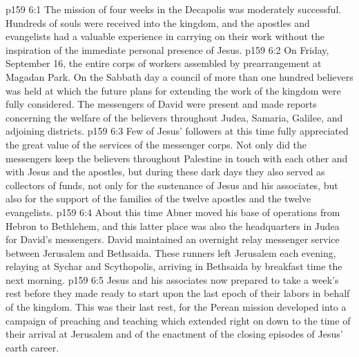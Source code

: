 \vs p159 6:1 The mission of four weeks in the Decapolis was moderately successful. Hundreds of souls were received into the kingdom, and the apostles and evangelists had a valuable experience in carrying on their work without the inspiration of the immediate personal presence of Jesus.
\vs p159 6:2 On Friday, September 16, the entire corps of workers assembled by prearrangement at Magadan Park. On the Sabbath day a council of more than one hundred believers was held at which the future plans for extending the work of the kingdom were fully considered. The messengers of David were present and made reports concerning the welfare of the believers throughout Judea, Samaria, Galilee, and adjoining districts.
\vs p159 6:3 Few of Jesus’ followers at this time fully appreciated the great value of the services of the messenger corps. Not only did the messengers keep the believers throughout Palestine in touch with each other and with Jesus and the apostles, but during these dark days they also served as collectors of funds, not only for the sustenance of Jesus and his associates, but also for the support of the families of the twelve apostles and the twelve evangelists.\plusone
\vs p159 6:4 About this time Abner moved his base of operations from Hebron to Bethlehem, and this latter place was also the headquarters in Judea for David’s messengers. David maintained an overnight relay messenger service between Jerusalem and Bethsaida. These runners left Jerusalem each evening, relaying at Sychar and Scythopolis, arriving in Bethsaida by breakfast time the next morning.
\vs p159 6:5 Jesus and his associates now prepared to take a week’s rest before they made ready to start upon the last epoch of their labors in behalf of the kingdom. This was their last rest, for the Perean mission developed into a campaign of preaching and teaching which extended right on down to the time of their arrival at Jerusalem and of the enactment of the closing episodes of Jesus’ earth career.
